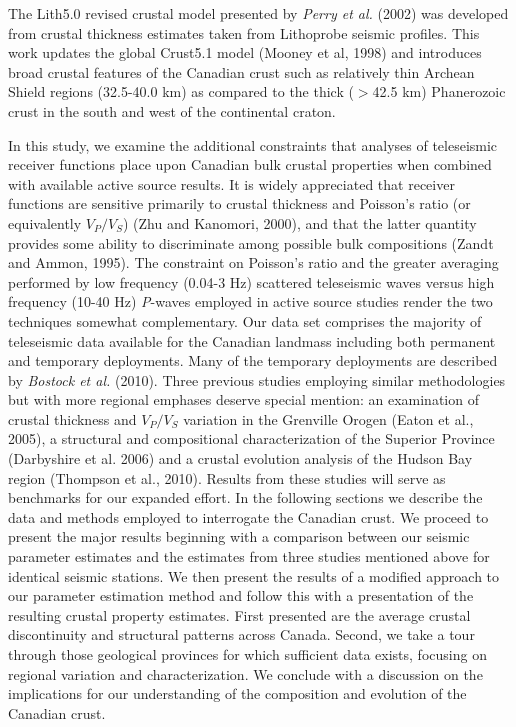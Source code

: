 \documentclass[review]{elsarticle}
\begin{document}
The Lith5.0 revised crustal model presented by {\it Perry et al.} (2002) was developed from crustal thickness estimates taken from Lithoprobe seismic profiles. This work updates the global Crust5.1 model (Mooney et al, 1998) and introduces broad crustal features of the Canadian crust such as relatively thin Archean Shield regions (32.5-40.0 km) as compared to the thick ($>$42.5 km) Phanerozoic crust in the south and west of the continental craton.

In this study, we examine the additional constraints that analyses of teleseismic receiver functions place upon Canadian bulk crustal properties when combined with available active source results. It is widely appreciated that receiver functions are sensitive primarily to crustal thickness and Poisson's ratio (or equivalently $V_P/V_S$) (Zhu and Kanomori, 2000), and that the latter quantity provides some ability to discriminate among possible bulk compositions (Zandt and Ammon, 1995). The constraint on Poisson's ratio and the greater averaging performed by low frequency (0.04-3 Hz) scattered teleseismic waves versus high frequency (10-40 Hz) {\it P}-waves employed in active source studies render the two techniques somewhat complementary. Our data set comprises the majority of teleseismic data available for the Canadian landmass including both permanent and temporary deployments. Many of the temporary deployments are described by {\it Bostock et al.} (2010). Three previous studies employing similar methodologies but with more regional emphases deserve special mention: an examination of crustal thickness and $V_P/V_S$ variation in the Grenville Orogen (Eaton et al., 2005), a structural and compositional characterization of the Superior Province (Darbyshire et al. 2006) and a crustal evolution analysis of the Hudson Bay region (Thompson et al., 2010). Results from these studies will serve as benchmarks for our expanded effort. In the following sections we describe the data and methods employed to interrogate the Canadian crust. We proceed to present the major results beginning with a comparison between our seismic parameter estimates and the estimates from three studies mentioned above for identical seismic stations. We then present the results of a modified approach to our parameter estimation method and follow this with a presentation of the resulting crustal property estimates.  First presented are the average crustal discontinuity and structural patterns across Canada. Second, we take a tour through those geological provinces for which sufficient data exists, focusing on regional variation and characterization. We conclude with a discussion on the implications for our understanding of the composition and evolution of the Canadian crust.
\end{document}
